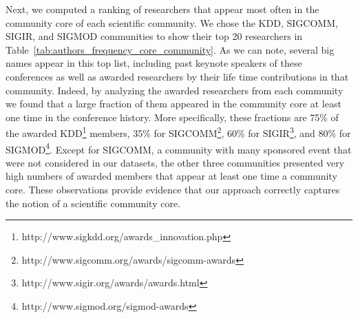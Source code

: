 Next, we computed a ranking of researchers that appear most often in the community core of each scientific community. We chose the KDD, SIGCOMM, SIGIR, and SIGMOD communities to
show their top 20 researchers in Table~\ref{tab:authors_frequency_core_community}.  As we can note, several big names appear in this top list, including past keynote speakers of
these conferences as well as awarded researchers by their life time contributions in that community. Indeed, by analyzing the awarded researchers from each community we found that
a large fraction of them appeared in the community core at least one time in the conference history. More specifically, these fractions are 75\% of the awarded
KDD\footnote{http://www.sigkdd.org/awards\_innovation.php} members, 35\% for SIGCOMM\footnote{http://www.sigcomm.org/awards/sigcomm-awards}, 60\% for
SIGIR\footnote{http://www.sigir.org/awards/awards.html}, and 80\% for SIGMOD\footnote{http://www.sigmod.org/sigmod-awards}.  Except for SIGCOMM, a community with many sponsored
event that were not considered in our datasets, the other three communities presented very high numbers of awarded members that appear at least one time a community core. These
observations provide evidence that our approach correctly captures the notion of a scientific community core.








